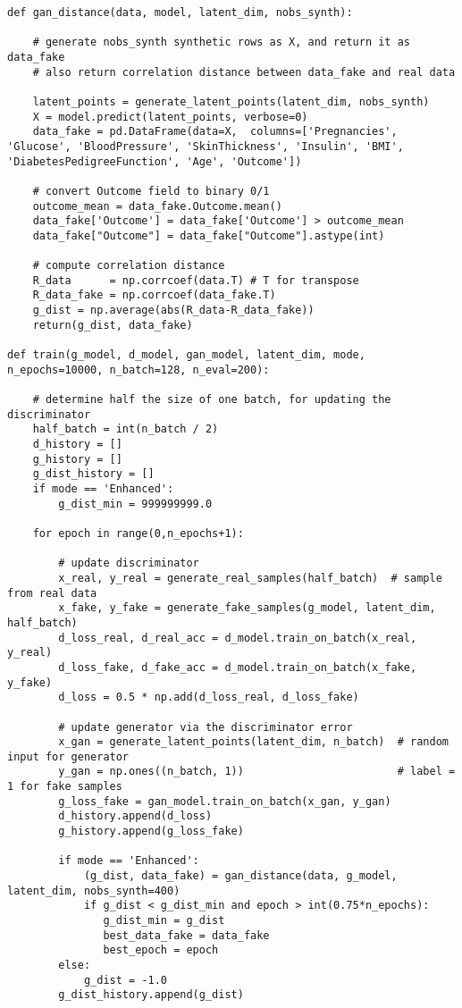 \documentclass[oneside,10pt]{book}
\begin{document}
\begin{lstlisting}
def gan_distance(data, model, latent_dim, nobs_synth): 

    # generate nobs_synth synthetic rows as X, and return it as data_fake
    # also return correlation distance between data_fake and real data

    latent_points = generate_latent_points(latent_dim, nobs_synth)  
    X = model.predict(latent_points, verbose=0)  
    data_fake = pd.DataFrame(data=X,  columns=['Pregnancies', 'Glucose', 'BloodPressure', 'SkinThickness', 'Insulin', 'BMI', 'DiabetesPedigreeFunction', 'Age', 'Outcome'])
 
    # convert Outcome field to binary 0/1
    outcome_mean = data_fake.Outcome.mean()
    data_fake['Outcome'] = data_fake['Outcome'] > outcome_mean
    data_fake["Outcome"] = data_fake["Outcome"].astype(int)

    # compute correlation distance
    R_data      = np.corrcoef(data.T) # T for transpose
    R_data_fake = np.corrcoef(data_fake.T)
    g_dist = np.average(abs(R_data-R_data_fake))
    return(g_dist, data_fake) 

def train(g_model, d_model, gan_model, latent_dim, mode, n_epochs=10000, n_batch=128, n_eval=200):   
    
    # determine half the size of one batch, for updating the  discriminator
    half_batch = int(n_batch / 2)
    d_history = [] 
    g_history = [] 
    g_dist_history = []
    if mode == 'Enhanced':
        g_dist_min = 999999999.0  

    for epoch in range(0,n_epochs+1): 
                 
        # update discriminator
        x_real, y_real = generate_real_samples(half_batch)  # sample from real data
        x_fake, y_fake = generate_fake_samples(g_model, latent_dim, half_batch)
        d_loss_real, d_real_acc = d_model.train_on_batch(x_real, y_real) 
        d_loss_fake, d_fake_acc = d_model.train_on_batch(x_fake, y_fake)
        d_loss = 0.5 * np.add(d_loss_real, d_loss_fake)

        # update generator via the discriminator error
        x_gan = generate_latent_points(latent_dim, n_batch)  # random input for generator
        y_gan = np.ones((n_batch, 1))                        # label = 1 for fake samples
        g_loss_fake = gan_model.train_on_batch(x_gan, y_gan) 
        d_history.append(d_loss)
        g_history.append(g_loss_fake)

        if mode == 'Enhanced': 
            (g_dist, data_fake) = gan_distance(data, g_model, latent_dim, nobs_synth=400)
            if g_dist < g_dist_min and epoch > int(0.75*n_epochs): 
               g_dist_min = g_dist
               best_data_fake = data_fake
               best_epoch = epoch
        else: 
            g_dist = -1.0
        g_dist_history.append(g_dist)
                

\end{lstlisting}
\end{document}
